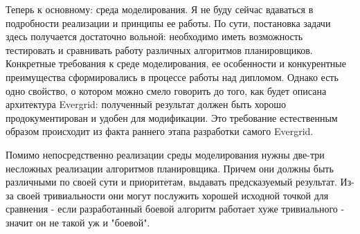 Теперь к основному: среда моделирования. Я не буду сейчас вдаваться в подробности реализации и принципы ее работы. По сути, постановка задачи здесь получается достаточно вольной: необходимо иметь возможность тестировать и сравнивать работу различных алгоритмов планировщиков. Конкретные требования к среде моделирования, ее особенности и конкурентные преимущества сформировались в процессе работы над дипломом. Однако есть одно свойство, о котором можно смело говорить до того, как будет описана архитектура Evergrid: полученный результат должен быть хорошо продокументирован и удобен для модификации. Это требование естественным образом происходит из факта раннего этапа разработки самого Evergrid.

Помимо непосредственно реализации среды моделирования нужны две-три несложных реализации алгоритмов планировщика. Причем они должны быть различными по своей сути и приоритетам, выдавать предсказуемый результат. Из-за своей тривиальности они могут послужить хорошей исходной точкой для сравнения - если разработанный боевой алгоритм работает хуже тривиального - значит он не такой уж и "боевой".